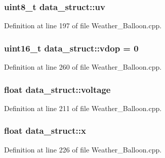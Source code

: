 \subsubsection[{\texorpdfstring{uv}{uv}}]{\setlength{\rightskip}{0pt plus 5cm}uint8\+\_\+t data\+\_\+struct\+::uv}\hypertarget{structdata__struct_a4013781a3dac77a6ae2f20ff8a869bdb}{}\label{structdata__struct_a4013781a3dac77a6ae2f20ff8a869bdb}


Definition at line 197 of file Weather\+\_\+\+Balloon.\+cpp.

\subsubsection[{\texorpdfstring{vdop}{vdop}}]{\setlength{\rightskip}{0pt plus 5cm}uint16\+\_\+t data\+\_\+struct\+::vdop = 0}\hypertarget{structdata__struct_abf304434a69cbc7ddccf5445ac40116b}{}\label{structdata__struct_abf304434a69cbc7ddccf5445ac40116b}


Definition at line 260 of file Weather\+\_\+\+Balloon.\+cpp.

\subsubsection[{\texorpdfstring{voltage}{voltage}}]{\setlength{\rightskip}{0pt plus 5cm}float data\+\_\+struct\+::voltage}\hypertarget{structdata__struct_aff54c50179e77b9e77f28244e1b6c7ed}{}\label{structdata__struct_aff54c50179e77b9e77f28244e1b6c7ed}


Definition at line 211 of file Weather\+\_\+\+Balloon.\+cpp.

\subsubsection[{\texorpdfstring{x}{x}}]{\setlength{\rightskip}{0pt plus 5cm}float data\+\_\+struct\+::x}\hypertarget{structdata__struct_aafb6ee9f998bdf479137e058e54c8605}{}\label{structdata__struct_aafb6ee9f998bdf479137e058e54c8605}


Definition at line 226 of file Weather\+\_\+\+Balloon.\+cpp.

